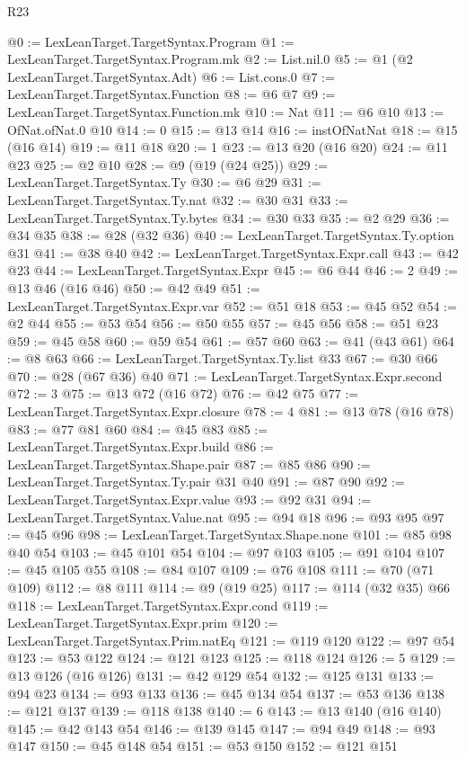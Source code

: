\begin{lexlean}{R23}
\begin{coremodule}
@0 := LexLeanTarget.TargetSyntax.Program
@1 := LexLeanTarget.TargetSyntax.Program.mk
@2 := List.nil.{0}
@5 := @1 (@2 LexLeanTarget.TargetSyntax.Adt)
@6 := List.cons.{0}
@7 := LexLeanTarget.TargetSyntax.Function
@8 := @6 @7
@9 := LexLeanTarget.TargetSyntax.Function.mk
@10 := Nat
@11 := @6 @10
@13 := OfNat.ofNat.{0} @10
@14 := 0
@15 := @13 @14
@16 := instOfNatNat
@18 := @15 (@16 @14)
@19 := @11 @18
@20 := 1
@23 := @13 @20 (@16 @20)
@24 := @11 @23
@25 := @2 @10
@28 := @9 (@19 (@24 @25))
@29 := LexLeanTarget.TargetSyntax.Ty
@30 := @6 @29
@31 := LexLeanTarget.TargetSyntax.Ty.nat
@32 := @30 @31
@33 := LexLeanTarget.TargetSyntax.Ty.bytes
@34 := @30 @33
@35 := @2 @29
@36 := @34 @35
@38 := @28 (@32 @36)
@40 := LexLeanTarget.TargetSyntax.Ty.option @31
@41 := @38 @40
@42 := LexLeanTarget.TargetSyntax.Expr.call
@43 := @42 @23
@44 := LexLeanTarget.TargetSyntax.Expr
@45 := @6 @44
@46 := 2
@49 := @13 @46 (@16 @46)
@50 := @42 @49
@51 := LexLeanTarget.TargetSyntax.Expr.var
@52 := @51 @18
@53 := @45 @52
@54 := @2 @44
@55 := @53 @54
@56 := @50 @55
@57 := @45 @56
@58 := @51 @23
@59 := @45 @58
@60 := @59 @54
@61 := @57 @60
@63 := @41 (@43 @61)
@64 := @8 @63
@66 := LexLeanTarget.TargetSyntax.Ty.list @33
@67 := @30 @66
@70 := @28 (@67 @36) @40
@71 := LexLeanTarget.TargetSyntax.Expr.second
@72 := 3
@75 := @13 @72 (@16 @72)
@76 := @42 @75
@77 := LexLeanTarget.TargetSyntax.Expr.closure
@78 := 4
@81 := @13 @78 (@16 @78)
@83 := @77 @81 @60
@84 := @45 @83
@85 := LexLeanTarget.TargetSyntax.Expr.build
@86 := LexLeanTarget.TargetSyntax.Shape.pair
@87 := @85 @86
@90 := LexLeanTarget.TargetSyntax.Ty.pair @31 @40
@91 := @87 @90
@92 := LexLeanTarget.TargetSyntax.Expr.value
@93 := @92 @31
@94 := LexLeanTarget.TargetSyntax.Value.nat
@95 := @94 @18
@96 := @93 @95
@97 := @45 @96
@98 := LexLeanTarget.TargetSyntax.Shape.none
@101 := @85 @98 @40 @54
@103 := @45 @101 @54
@104 := @97 @103
@105 := @91 @104
@107 := @45 @105 @55
@108 := @84 @107
@109 := @76 @108
@111 := @70 (@71 @109)
@112 := @8 @111
@114 := @9 (@19 @25)
@117 := @114 (@32 @35) @66
@118 := LexLeanTarget.TargetSyntax.Expr.cond
@119 := LexLeanTarget.TargetSyntax.Expr.prim
@120 := LexLeanTarget.TargetSyntax.Prim.natEq
@121 := @119 @120
@122 := @97 @54
@123 := @53 @122
@124 := @121 @123
@125 := @118 @124
@126 := 5
@129 := @13 @126 (@16 @126)
@131 := @42 @129 @54
@132 := @125 @131
@133 := @94 @23
@134 := @93 @133
@136 := @45 @134 @54
@137 := @53 @136
@138 := @121 @137
@139 := @118 @138
@140 := 6
@143 := @13 @140 (@16 @140)
@145 := @42 @143 @54
@146 := @139 @145
@147 := @94 @49
@148 := @93 @147
@150 := @45 @148 @54
@151 := @53 @150
@152 := @121 @151

\end{coremodule}
\end{lexlean}
